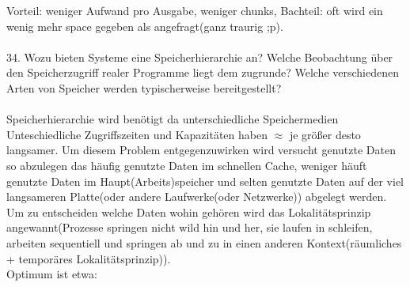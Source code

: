 \documentclass{article}
\begin{document}
Vorteil: weniger Aufwand pro Ausgabe, weniger chunks, Bachteil: oft wird ein wenig mehr space gegeben als angefragt(ganz traurig ;p).
\\
\\
34. Wozu bieten Systeme eine Speicherhierarchie an? Welche Beobachtung über den Speicherzugriff realer Programme liegt dem zugrunde? Welche verschiedenen Arten von Speicher
werden typischerweise bereitgestellt?
\\
\\
Speicherhierarchie wird ben\"otigt da unterschiedliche Speichermedien Unteschiedliche Zugriffszeiten und Kapazit\"aten haben $\approx$ je gr\"o\ss er desto langsamer.
Um diesem Problem entgegenzuwirken wird versucht genutzte Daten so abzulegen das h\"aufig genutzte Daten im schnellen Cache, weniger h\"auft genutzte Daten im Haupt(Arbeits)speicher und selten genutzte Daten auf der viel langsameren Platte(oder andere Laufwerke(oder Netzwerke)) abgelegt werden. Um zu entscheiden welche Daten wohin geh\"oren wird das Lokalit\"atsprinzip angewannt(Prozesse springen nicht wild hin und her, sie laufen in schleifen, arbeiten sequentiell und springen ab und zu in einen anderen Kontext(r\"aumliches + tempor\"ares Lokalit\"atsprinzip)).\\
Optimum ist etwa:
\end{document}
